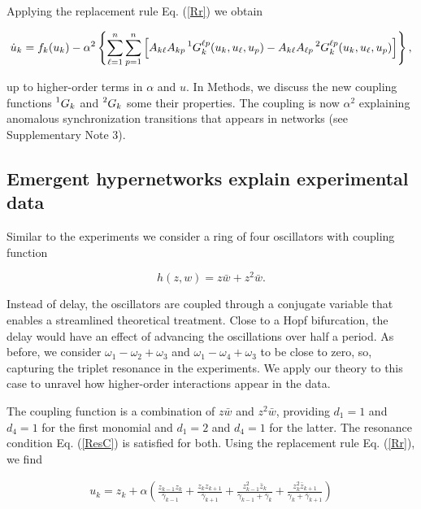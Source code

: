 \documentclass[12pt]{article}
\theoremstyle{plain}
\theoremstyle{definition}
\theoremstyle{remark}
\theoremstyle{remark}
\begin{document}
Applying the replacement rule Eq. (\ref{Rr}) we obtain  
\begin{linenomath}
\begin{align}\label{Eq1-transf-1}
\dot{u}_k = f_k(u_k) - \alpha^2 \left\{ \sum_{\ell = 1}^n  \sum_{p = 1}^n  \left[  A_{k \ell} A_{k p} \prescript{1}{}{G}_{k}^{\ell p}(u_k, u_{\ell}, u_p) 
-  A_{k \ell} A_{\ell p} \prescript{2}{}{G}_{k}^{\ell p}(u_k, u_{\ell}, u_p) \right]\right\},
\end{align}
\end{linenomath}
\noindent
up to higher-order terms in $\alpha$ and $u$. 
In Methods, we discuss the new coupling functions $\prescript{1}{}{G}_{k}$ and $\prescript{2}{}{G}_{k}$ some their properties. The coupling  is now $\alpha^2$ explaining anomalous synchronization transitions that appears in networks (see {Supplementary Note 3}). 

\subsection*{Emergent hypernetworks explain experimental data}

Similar to the experiments we consider a ring of four oscillators with coupling function
\begin{linenomath}
\begin{equation}\label{degree3}
h(z,w) = z \bar w + z^2 \bar w. 
\end{equation} 
\end{linenomath}
\noindent 
Instead of delay, the oscillators are coupled through a conjugate variable that enables a streamlined theoretical treatment. Close to a Hopf bifurcation, the delay would have an effect of advancing the oscillations over half a period. {\color{black}As before, we consider $\omega_1 - \omega_2 + \omega_3$ and $\omega_1 - \omega_4 + \omega_3$ to be close to zero, so, capturing the triplet resonance in the experiments.} We apply our theory to this case to unravel how higher-order interactions appear in the data. 

The coupling function is a combination of $z \bar w$ and $z^2 \bar w$, providing $d_1 = 1$ and $d_4 = 1$ for the first monomial and $d_1 = 2$ and $d_4  = 1$ for the latter. The resonance condition Eq. (\ref{ResC}) is satisfied for both. Using the replacement rule Eq. (\ref{Rr}), we find 
\begin{linenomath}
\begin{eqnarray}\label{Trans}
u_k=z_k+\alpha \left( \frac{z_{k-1}z_k}{\bar \gamma_{k-1}} + \frac{z_{k}z_{k+1}}{\bar \gamma_{k+1}} + \frac{z_{k-1}^2\bar{z}_k}{\gamma_{k-1} + \bar{\gamma}_{k}} 
+
\frac{z_k^2\bar{z}_{k+1}}{\gamma_k + \bar{\gamma}_{k+1}}
\right) 
\end{eqnarray}
\end{linenomath}
\end{document}
